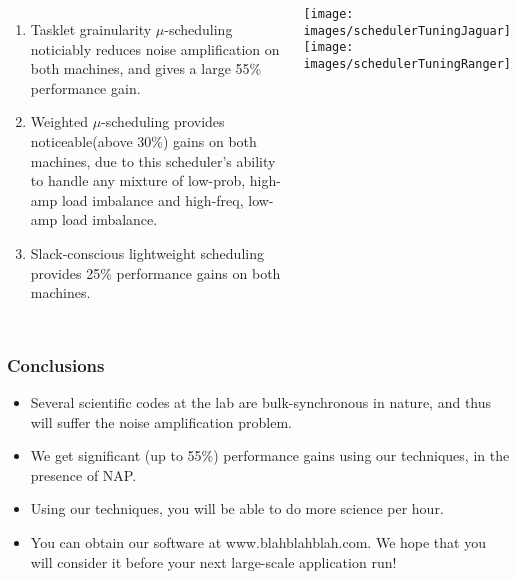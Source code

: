 \begin{frame}
\begin{columns}
\begin{enumerate}
\item \tiny Tasklet grainularity $\mu$-scheduling noticiably reduces noise amplification on both machines, and gives a large 55\% performance gain.
\item \tiny Weighted $\mu$-scheduling provides noticeable(above 30\%) gains on
  both machines,  due to this scheduler's ability to handle any mixture
  of low-prob, high-amp load imbalance and high-freq, low-amp load
  imbalance.
\item \tiny Slack-conscious lightweight scheduling provides 25\% performance gains on both machines.
\end{enumerate}
\texttt{[image: images/schedulerTuningJaguar]} \\
\texttt{[image: images/schedulerTuningRanger]}
\end{columns}
\end{frame}

\begin{frame}
\frametitle{Conclusions}
\begin{itemize}
\item Several scientific codes at the lab are bulk-synchronous in nature, and thus will suffer the noise amplification problem.
\item We get significant (up to 55\%) performance gains using our techniques,  in the presence of NAP.
\item Using our techniques, you will be able to do more science per hour.
\item You can obtain our software at www.blahblahblah.com. We hope that you will consider it before your next large-scale application run!
\end{itemize}
\end{frame}


